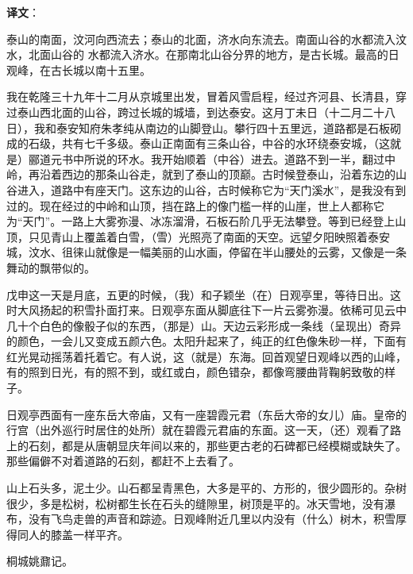 \documentclass[12pt,UTF-8,openany,a4]{ctexbook}
\begin{document}
\newpage

\begin{Large}
   \noindent \textbf{译文}：
\end{Large}

\vspace{1em}

\begin{large}\yiwen
    
    泰山的南面，汶河向西流去；泰山的北面，济水向东流去。南面山谷的水都流入汶水，北面山谷的 水都流入济水。在那南北山谷分界的地方，是古长城。最高的日观峰，在古长城以南十五里。
    
    我在乾隆三十九年十二月从京城里出发，冒着风雪启程，经过齐河县、长清县，穿过泰山西北面的山谷，跨过长城的城墙，到达泰安。这月丁未日（十二月二十八日），我和泰安知府朱孝纯从南边的山脚登山。攀行四十五里远，道路都是石板砌成的石级，共有七千多级。泰山正南面有三条山谷，中谷的水环绕泰安城，（这就是）郦道元书中所说的环水。我开始顺着（中谷）进去。道路不到一半，翻过中岭，再沿着西边的那条山谷走，就到了泰山的顶巅。古时候登泰山，沿着东边的山谷进入，道路中有座天门。这东边的山谷，古时候称它为“天门溪水”，是我没有到过的。现在经过的中岭和山顶，挡在路上的像门槛一样的山崖，世上人都称它为“天门”。一路上大雾弥漫、冰冻溜滑，石板石阶几乎无法攀登。等到已经登上山顶，只见青山上覆盖着白雪，（雪）光照亮了南面的天空。远望夕阳映照着泰安城，汶水、徂徕山就像是一幅美丽的山水画，停留在半山腰处的云雾，又像是一条舞动的飘带似的。
    
    戊申这一天是月底，五更的时候，（我）和子颖坐（在）日观亭里，等待日出。这时大风扬起的积雪扑面打来。日观亭东面从脚底往下一片云雾弥漫。依稀可见云中几十个白色的像骰子似的东西，（那是）山。天边云彩形成一条线（呈现出）奇异的颜色，一会儿又变成五颜六色。太阳升起来了，纯正的红色像朱砂一样，下面有红光晃动摇荡着托着它。有人说，这（就是）东海。回首观望日观峰以西的山峰，有的照到日光，有的照不到，或红或白，颜色错杂，都像弯腰曲背鞠躬致敬的样子。
    
    日观亭西面有一座东岳大帝庙，又有一座碧霞元君（东岳大帝的女儿）庙。皇帝的行宫（出外巡行时居住的处所）就在碧霞元君庙的东面。这一天，（还）观看了路上的石刻，都是从唐朝显庆年间以来的，那些更古老的石碑都已经模糊或缺失了。那些偏僻不对着道路的石刻，都赶不上去看了。
    
    山上石头多，泥土少。山石都呈青黑色，大多是平的、方形的，很少圆形的。杂树很少，多是松树，松树都生长在石头的缝隙里，树顶是平的。冰天雪地，没有瀑布，没有飞鸟走兽的声音和踪迹。日观峰附近几里以内没有（什么）树木，积雪厚得同人的膝盖一样平齐。
    
    桐城姚鼐记。
    

\end{large}
\end{document}
